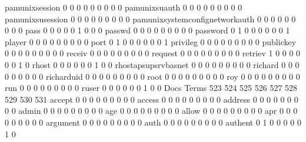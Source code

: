 \documentclass[compress,8pt]{beamer}
\begin{document}
\begin{frame}
\begin{Schunk}
  pamunixsession                             0   0   0   0   0   0   0   0   0
  pamunixsuauth                              0   0   0   0   0   0   0   0   0
  pamunixsusession                           0   0   0   0   0   0   0   0   0
  pamunixsystemconfignetworkauth             0   0   0   0   0   0   0   0   0
  pass                                       0   0   0   0   0   1   0   0   0
  passwd                                     0   0   0   0   0   0   0   0   0
  password                                   0   1   0   0   0   0   0   0   1
  player                                     0   0   0   0   0   0   0   0   0
  port                                       0   1   0   0   0   0   0   0   1
  privileg                                   0   0   0   0   0   0   0   0   0
  publickey                                  0   0   0   0   0   0   0   0   0
  receiv                                     0   0   0   0   0   0   0   0   0
  request                                    0   0   0   0   0   0   0   0   0
  retriev                                    1   0   0   0   0   0   0   1   0
  rhost                                      0   0   0   0   0   0   1   0   0
  rhostapsupsrvbasnet                        0   0   0   0   0   0   0   0   0
  richard                                    0   0   0   0   0   0   0   0   0
  richarduid                                 0   0   0   0   0   0   0   0   0
  root                                       0   0   0   0   0   0   0   0   0
  roy                                        0   0   0   0   0   0   0   0   0
  run                                        0   0   0   0   0   0   0   0   0
  ruser                                      0   0   0   0   0   0   1   0   0
                                          Docs
Terms                                      523 524 525 526 527 528 529 530 531
  accept                                     0   0   0   0   0   0   0   0   0
  access                                     0   0   0   0   0   0   0   0   0
  address                                    0   0   0   0   0   0   0   0   0
  admin                                      0   0   0   0   0   0   0   0   0
  age                                        0   0   0   0   0   0   0   0   0
  allow                                      0   0   0   0   0   0   0   0   0
  apr                                        0   0   0   0   0   0   0   0   0
  argument                                   0   0   0   0   0   0   0   0   0
  auth                                       0   0   0   0   0   0   0   0   0
  authent                                    0   1   0   0   0   0   0   1   0

\end{Schunk}
\end{frame}
\end{document}

